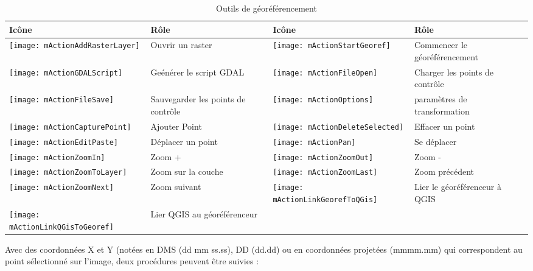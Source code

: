 \begin{table}[h]
\begin{tabular}{|m{1cm}|m{6cm}|m{1cm}|m{6cm}|}
 \hline \textbf{Icône} & \textbf{Rôle} & \textbf{Icône} & \textbf{Rôle} \\
 \hline \texttt{[image: mActionAddRasterLayer]} & Ouvrir un raster &
   \texttt{[image: mActionStartGeoref]} & Commencer le géoréférencement \\
 \hline \texttt{[image: mActionGDALScript]} & Geénérer le script GDAL &
   \texttt{[image: mActionFileOpen]} & Charger les points de contrôle \\
 \hline \texttt{[image: mActionFileSave]} & Sauvegarder les points de contrôle &
   \texttt{[image: mActionOptions]} & paramètres de transformation \\
 \hline \texttt{[image: mActionCapturePoint]} & Ajouter Point &
   \texttt{[image: mActionDeleteSelected]} & Effacer un point \\
 \hline \texttt{[image: mActionEditPaste]} & Déplacer un point &
   \texttt{[image: mActionPan]} & Se déplacer \\
 \hline \texttt{[image: mActionZoomIn]} & Zoom + &
   \texttt{[image: mActionZoomOut]} & Zoom - \\
 \hline \texttt{[image: mActionZoomToLayer]} & Zoom sur la couche &
   \texttt{[image: mActionZoomLast]} & Zoom précédent \\
 \hline \texttt{[image: mActionZoomNext]} & Zoom suivant &
   \texttt{[image: mActionLinkGeorefToQGis]} & Lier le géoréférenceur à QGIS \\
 \hline \texttt{[image: mActionLinkQGisToGeoref]} & Lier QGIS au géoréférenceur &
 &  \\
\hline
\end{tabular}
\caption{Outils de géoréférencement}\label{tab:georeferencer_tools}
\end{table}



Avec des coordonnées X et Y (notées en DMS (dd mm ss.ss), DD (dd.dd) ou en coordonnées projetées 
(mmmm.mm) qui correspondent au point sélectionné sur l'image, deux procédures peuvent être suivies :


